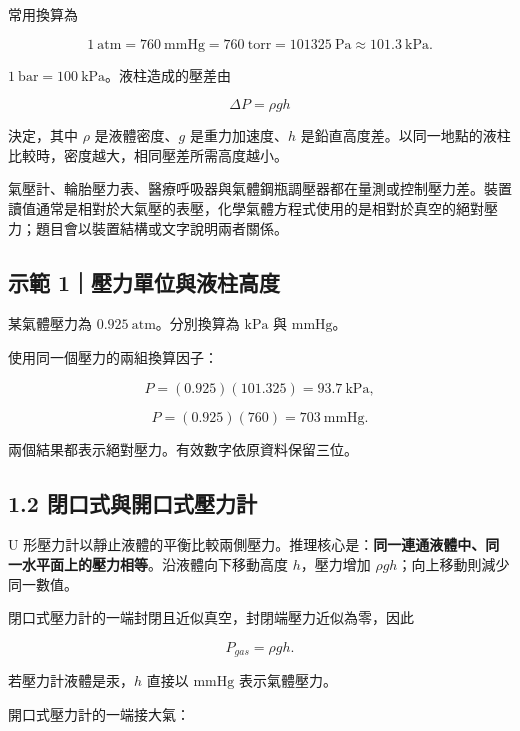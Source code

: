 \documentclass[11pt,a4paper]{article}
\begin{document}
常用換算為

\[
1\ \mathrm{atm}=760\ \mathrm{mmHg}=760\ \mathrm{torr}=101325\ \mathrm{Pa}\approx101.3\ \mathrm{kPa}.
\]

\(1\ \mathrm{bar}=100\ \mathrm{kPa}\)。液柱造成的壓差由

\[
\Delta P=\rho gh
\]

決定，其中 \(\rho\) 是液體密度、\(g\) 是重力加速度、\(h\) 是鉛直高度差。以同一地點的液柱比較時，密度越大，相同壓差所需高度越小。

氣壓計、輪胎壓力表、醫療呼吸器與氣體鋼瓶調壓器都在量測或控制壓力差。裝置讀值通常是相對於大氣壓的表壓，化學氣體方程式使用的是相對於真空的絕對壓力；題目會以裝置結構或文字說明兩者關係。

\begin{HandoutWorkedExample}

\subsection{示範 1｜壓力單位與液柱高度}\label{ux793aux7bc4-1ux58d3ux529bux55aeux4f4dux8207ux6db2ux67f1ux9ad8ux5ea6}

某氣體壓力為 \(0.925\ \mathrm{atm}\)。分別換算為 \(\mathrm{kPa}\) 與 \(\mathrm{mmHg}\)。

使用同一個壓力的兩組換算因子：

\[
P=(0.925)(101.325)=93.7\ \mathrm{kPa},
\]

\[
P=(0.925)(760)=703\ \mathrm{mmHg}.
\]

兩個結果都表示絕對壓力。有效數字依原資料保留三位。

\end{HandoutWorkedExample}

\subsection{1.2 閉口式與開口式壓力計}\label{ux9589ux53e3ux5f0fux8207ux958bux53e3ux5f0fux58d3ux529bux8a08}

U 形壓力計以靜止液體的平衡比較兩側壓力。推理核心是：\textbf{同一連通液體中、同一水平面上的壓力相等}。沿液體向下移動高度 \(h\)，壓力增加 \(\rho gh\)；向上移動則減少同一數值。

閉口式壓力計的一端封閉且近似真空，封閉端壓力近似為零，因此

\[
P_{gas}=\rho gh.
\]

若壓力計液體是汞，\(h\) 直接以 \(\mathrm{mmHg}\) 表示氣體壓力。

開口式壓力計的一端接大氣：
\end{document}
